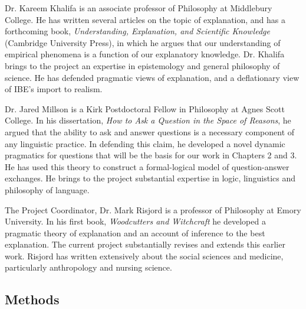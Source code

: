 \documentclass{article}[11pt]
\begin{document}
Dr. Kareem Khalifa is an associate professor of Philosophy at Middlebury College. He has written several articles on the topic of explanation, and has a forthcoming book, \textit{Understanding, Explanation, and Scientific Knowledge} (Cambridge University Press), in which he argues that our understanding of empirical phenomena is a function of our explanatory knowledge. Dr. Khalifa brings to the project an expertise in epistemology and general philosophy of science. He has defended pragmatic views of explanation, and a deflationary view of IBE's import to realism.

Dr. Jared Millson is a Kirk Postdoctoral Fellow in Philosophy at Agnes Scott College. In his dissertation, \textit{How to Ask a Question in the Space of Reasons}, he argued that the ability to ask and answer questions is a necessary component of any linguistic practice. In defending this claim, he developed a novel dynamic pragmatics for questions that will be the basis for our work in Chapters 2 and 3. He has used this theory to construct a formal-logical model of question-answer exchanges. He brings to the project substantial expertise in logic, linguistics and philosophy of language.

The Project Coordinator, Dr. Mark Risjord is a professor of Philosophy at Emory University. In his first book, \textit{Woodcutters and Witchcraft} he developed a pragmatic theory of explanation and an account of inference to the best explanation.  The current project substantially revises and extends this earlier work.  Risjord has written extensively about the social sciences and medicine, particularly anthropology and nursing science. 

\clearpage
{}
\subsection{Methods}

%
%
\end{document}
